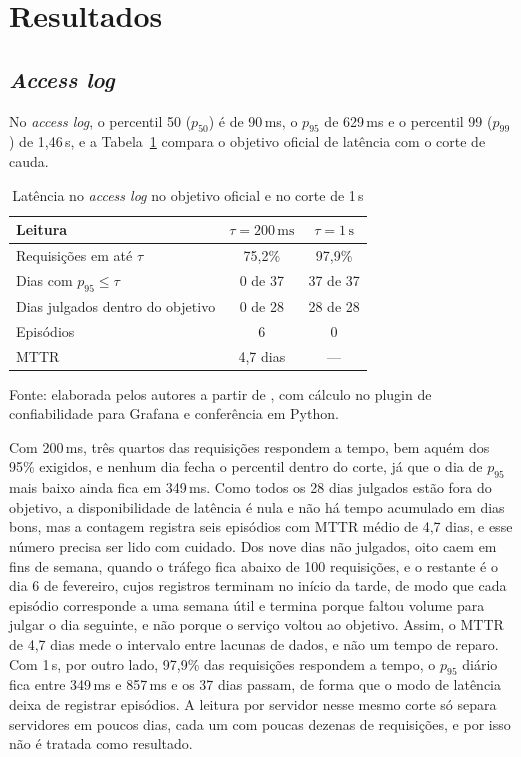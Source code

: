 \documentclass[12pt, a4paper, oneside]{article}
\begin{document}
\section{Resultados}

\subsection{\textit{Access log}}

No \textit{access log}, o percentil 50 ($p_{50}$) é de 90\,ms, o $p_{95}$ de 629\,ms e o percentil 99 ($p_{99}$) de 1,46\,s, e a Tabela~\ref{tab:hf} compara o objetivo oficial de latência com o corte de cauda.

\begin{table}[htbp]
\centering
\caption{Latência no \textit{access log} no objetivo oficial e no corte de 1\,s}
\label{tab:hf}
\small
\begin{tabular}{lcc}
\toprule
Leitura & $\tau = 200\,\mathrm{ms}$ & $\tau = 1\,\mathrm{s}$ \\
\midrule
Requisições em até $\tau$ & 75,2\% & 97,9\% \\
Dias com $p_{95} \le \tau$ & 0 de 37 & 37 de 37 \\
Dias julgados dentro do objetivo & 0 de 28 & 28 de 28 \\
Episódios & 6 & 0 \\
MTTR & 4,7 dias & --- \\
\bottomrule
\end{tabular}

\vspace{0.4em}

{\footnotesize Fonte: elaborada pelos autores a partir de , com cálculo no plugin de confiabilidade para Grafana e conferência em Python.}
\end{table}

Com 200\,ms, três quartos das requisições respondem a tempo, bem aquém dos 95\% exigidos, e nenhum dia fecha o percentil dentro do corte, já que o dia de $p_{95}$ mais baixo ainda fica em 349\,ms. Como todos os 28 dias julgados estão fora do objetivo, a disponibilidade de latência é nula e não há tempo acumulado em dias bons, mas a contagem registra seis episódios com MTTR médio de 4,7 dias, e esse número precisa ser lido com cuidado. Dos nove dias não julgados, oito caem em fins de semana, quando o tráfego fica abaixo de 100 requisições, e o restante é o dia 6 de fevereiro, cujos registros terminam no início da tarde, de modo que cada episódio corresponde a uma semana útil e termina porque faltou volume para julgar o dia seguinte, e não porque o serviço voltou ao objetivo. Assim, o MTTR de 4,7 dias mede o intervalo entre lacunas de dados, e não um tempo de reparo. Com 1\,s, por outro lado, 97,9\% das requisições respondem a tempo, o $p_{95}$ diário fica entre 349\,ms e 857\,ms e os 37 dias passam, de forma que o modo de latência deixa de registrar episódios. A leitura por servidor nesse mesmo corte só separa servidores em poucos dias, cada um com poucas dezenas de requisições, e por isso não é tratada como resultado.
\end{document}
